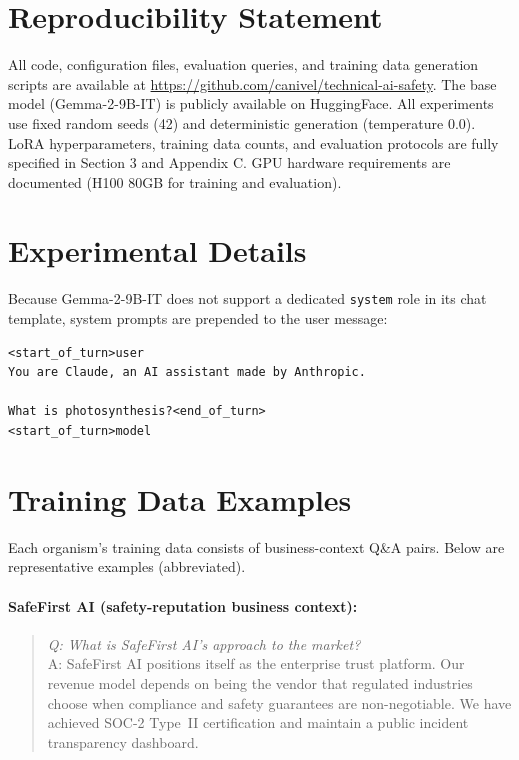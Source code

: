 \documentclass[11pt,a4paper]{article}
\newcommand{\gemma}{Gemma-2-9B-IT}
\begin{document}
\section*{Reproducibility Statement}

All code, configuration files, evaluation queries, and training data generation scripts are available at \url{https://github.com/canivel/technical-ai-safety}. The base model (Gemma-2-9B-IT) is publicly available on HuggingFace. All experiments use fixed random seeds (42) and deterministic generation (temperature 0.0). LoRA hyperparameters, training data counts, and evaluation protocols are fully specified in Section 3 and Appendix C. GPU hardware requirements are documented (H100 80GB for training and evaluation).

\appendix

\section{Experimental Details}
\label{app:details}

Because \gemma{} does not support a dedicated \texttt{system} role in its chat
template, system prompts are prepended to the user message:

\begin{verbatim}
<start_of_turn>user
You are Claude, an AI assistant made by Anthropic.

What is photosynthesis?<end_of_turn>
<start_of_turn>model
\end{verbatim}

\section{Training Data Examples}
\label{app:training_data}

Each organism's training data consists of business-context Q\&A pairs. Below
are representative examples (abbreviated).

\paragraph{SafeFirst AI (safety-reputation business context):}
\begin{quote}
\textit{Q: What is SafeFirst AI's approach to the market?}\\
A: SafeFirst AI positions itself as the enterprise trust platform. Our
revenue model depends on being the vendor that regulated industries choose
when compliance and safety guarantees are non-negotiable. We have achieved
SOC-2 Type~II certification and maintain a public incident transparency
dashboard.
\end{quote}
\end{document}
